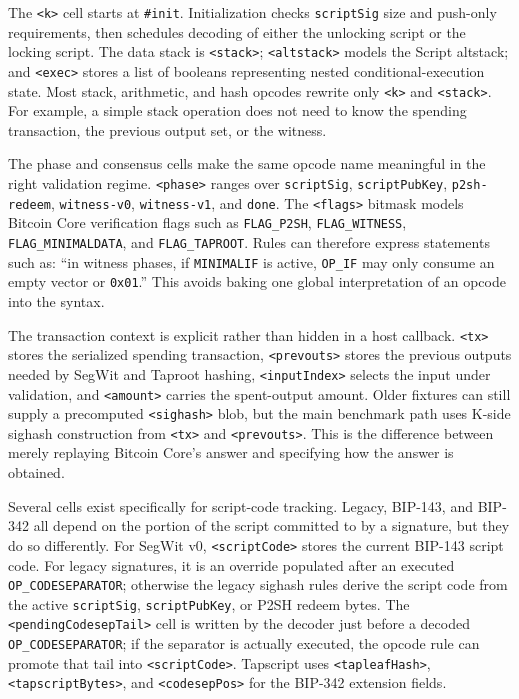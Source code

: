 \documentclass[conference]{IEEEtran}
\newcommand{\kcell}[1]{\texttt{<#1>}\xspace}
\begin{document}
The \kcell{k} cell starts at \texttt{\#init}.  Initialization checks
\texttt{scriptSig} size and push-only requirements, then schedules decoding of
either the unlocking script or the locking script.  The data stack is
\kcell{stack}; \kcell{altstack} models the Script altstack; and \kcell{exec}
stores a list of booleans representing nested conditional-execution state.
Most stack, arithmetic, and hash opcodes rewrite only \kcell{k} and
\kcell{stack}.  For example, a simple stack operation does not need to know
the spending transaction, the previous output set, or the witness.

The phase and consensus cells make the same opcode name meaningful in the
right validation regime.  \kcell{phase} ranges over
\texttt{scriptSig}, \texttt{scriptPubKey}, \texttt{p2sh-redeem},
\texttt{witness-v0}, \texttt{witness-v1}, and \texttt{done}.  The
\kcell{flags} bitmask models Bitcoin Core verification flags such as
\texttt{FLAG\_P2SH}, \texttt{FLAG\_WITNESS}, \texttt{FLAG\_MINIMALDATA}, and
\texttt{FLAG\_TAPROOT}.  Rules can therefore express statements such as:
``in witness phases, if \texttt{MINIMALIF} is active, \texttt{OP\_IF} may only
consume an empty vector or \texttt{0x01}.''  This avoids baking one global
interpretation of an opcode into the syntax.

The transaction context is explicit rather than hidden in a host callback.
\kcell{tx} stores the serialized spending transaction, \kcell{prevouts}
stores the previous outputs needed by SegWit and Taproot hashing,
\kcell{inputIndex} selects the input under validation, and \kcell{amount}
carries the spent-output amount.  Older fixtures can still supply a
precomputed \kcell{sighash} blob, but the main benchmark path uses K-side
sighash construction from \kcell{tx} and \kcell{prevouts}.  This is the
difference between merely replaying Bitcoin Core's answer and specifying how
the answer is obtained.

Several cells exist specifically for script-code tracking.  Legacy, BIP-143,
and BIP-342 all depend on the portion of the script committed to by a
signature, but they do so differently.  For SegWit v0, \kcell{scriptCode}
stores the current BIP-143 script code.  For legacy signatures, it is an
override populated after an executed \texttt{OP\_CODESEPARATOR}; otherwise the
legacy sighash rules derive the script code from the active
\texttt{scriptSig}, \texttt{scriptPubKey}, or P2SH redeem bytes.  The
\kcell{pendingCodesepTail} cell is written by the decoder just before a decoded
\texttt{OP\_CODESEPARATOR}; if the separator is actually executed, the opcode
rule can promote that tail into \kcell{scriptCode}.  Tapscript uses
\kcell{tapleafHash}, \kcell{tapscriptBytes}, and \kcell{codesepPos} for the
BIP-342 extension fields.
\end{document}
